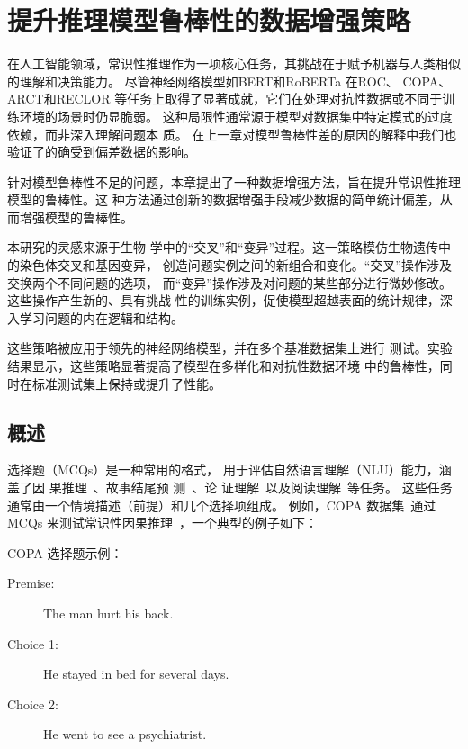\section{提升推理模型鲁棒性的数据增强策略}

在人工智能领域，常识性推理作为一项核心任务，其挑战在于赋予机器与人类相似的理解和决策能力。
尽管神经网络模型如BERT\cite{devlin2018bert}和RoBERTa\cite{liu2019roberta}
在ROC\cite{mostafazadeh2016corpus}、
COPA\cite{roemmele2011choice}、ARCT\cite{habernal2018argument}和RECLOR\cite{yu2020reclor}
等任务上取得了显著成就，它们在处理对抗性数据或不同于训练环境的场景时仍显脆弱。
这种局限性通常源于模型对数据集中特定模式的过度依赖，而非深入理解问题本
质\cite{naik2018stress,mccoy2019right,schuster2019towards,nie2020adversarial}。
在上一章对模型鲁棒性差的原因的解释中我们也验证了的确受到偏差数据的影响。

针对模型鲁棒性不足的问题，本章提出了一种数据增强方法，旨在提升常识性推理模型的鲁棒性。这
种方法通过创新的数据增强手段减少数据的简单统计偏差，从而增强模型的鲁棒性。

本研究的灵感来源于生物
学中的``交叉''和``变异''过程。这一策略模仿生物遗传中的染色体交叉和基因变异，
创造问题实例之间的新组合和变化。``交叉''操作涉及交换两个不同问题的选项，
而``变异''操作涉及对问题的某些部分进行微妙修改。这些操作产生新的、具有挑战
性的训练实例，促使模型超越表面的统计规律，深入学习问题的内在逻辑和结构。

这些策略被应用于领先的神经网络模型，并在多个基准数据集上进行
测试。实验结果显示，这些策略显著提高了模型在多样化和对抗性数据环境
中的鲁棒性，同时在标准测试集上保持或提升了性能。


\subsection{概述}
\label{sec3:intro}
选择题（MCQs）是一种常用的格式，
用于评估自然语言理解（NLU）能力，涵盖了因
果推理~\cite{roemmele2011choice}、故事结尾预
测~\cite{mostafazadeh2016corpus,huang20story}、论
证理解~\cite{habernal2018argument}以及阅读理解~\cite{yu2020reclor}等任务。
这些任务通常由一个情境描述（前提）和几个选择项组成。
例如，COPA 数据集~\cite{roemmele2011choice}通过 MCQs 
来测试常识性因果推理~\cite{luo2016commonsense}，一个典型的例子如下：

\begin{example}\label{ex:copa}
    COPA 选择题示例：
    \begin{description}
        \item[Premise:] The man hurt his back.
        \item[Choice 1:] He stayed in bed for several days. \checksymbol
        \item[Choice 2:] He went to see a psychiatrist. \crosssymbol
        \end{description}
        \end{example}

